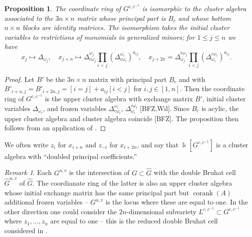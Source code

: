 \documentclass[12pt]{amsart}
\newcommand{\kk}{\Bbbk}%
\DeclareMathOperator{\corank}{corank}
\newtheorem{proposition}[theorem]{Proposition}
\theoremstyle{remark}
\newtheorem{remark}[theorem]{Remark}
\numberwithin{equation}{section}
\begin{document}

\begin{proposition}\label{prop:coordring}
The coordinate ring of $G^{c,c^{-1}}$ is isomorphic to the cluster algebra associated to the $3n \times n$ matrix whose principal part is $B_c$ and whose bottom $n \times n$ blocks are identity matrices. 
The isomorphism takes the initial cluster variables to restrictions of monomials in generalized minors; for $1 \leq j \leq n$ we have 
\begin{equation}\label{eq:initialcluster}
x_j \mapsto \Delta_{\omega_j},\quad x_{j+n} \mapsto \Delta^{\omega_j}_{ c\omega_j} \prod_{i < j}(\Delta^{\omega_i}_{c \omega_i})^{a_{ij}},\quad x_{j+2n} = \Delta^{c \omega_j}_{\omega_j} \prod_{i < j}(\Delta^{c \omega_i}_{\omega_i})^{a_{ij}}.
\end{equation}
\end{proposition}
\begin{proof}
Let $B'$ be the $3n \times n$ matrix with principal part $B_c$ and with $B'_{i+n,j} = B'_{i+2n,j} = [i = j] + a_{ij}[i < j]$ for $i,j \in [1,n]$.  Then the coordinate ring of $G^{c,c^{-1}}$ is the upper cluster algebra with exchange matrix $B'$, initial cluster variables $\Delta_{\omega_i}$, and frozen variables $\Delta^{\omega_i}_{c \omega_i}$, $\Delta^{c \omega_i}_{\omega_i}$ [BFZ,Wil]. Since $B_c$ is acylic, the upper cluster algebra and cluster algebra coincide [BFZ]. The proposition then follows from an application of .
\end{proof}

We often write $z_i$ for $x_{i+n}$ and $z_{-i}$ for $x_{i+2n}$, and say that $\kk[G^{c,c^{-1}}]$ is a cluster algebra with ``doubled principal coefficients.''

\begin{remark}
Each $G^{u,v}$ is the intersection of $G \subset \widehat{G}$ with the double Bruhat cell $\widehat{G}^{u,v}$ of $\widehat{G}$. The coordianate ring of the latter is also an upper cluster algebra whose initial exchange matrix has the same principal part but $\corank(A)$ additional frozen variables -- $G^{u,v}$ is the locus where these are equal to one. In the other direction one could consider the $2n$-dimensional subvariety $L^{c,c^{-1}} \subset G^{c,c^{-1}}$ where $z_1,\dotsc,z_n$ are equal to one -- this is the reduced double Bruhat cell considered in \cite{YZ08}.
\end{remark}
\end{document}
